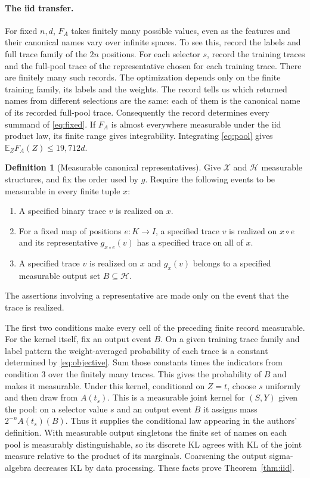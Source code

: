 \documentclass[11pt]{article}
\theoremstyle{definition}\newtheorem{definition}[theorem]{Definition}
\newcommand{\E}{\mathbb E}
\newcommand{\HH}{\mathcal H}
\newcommand{\XX}{\mathcal X}
\begin{document}
\paragraph{The iid transfer.}
For fixed $n,d$, $F_A$ takes finitely many possible values, even as the
features and their canonical names vary over infinite spaces. To see this,
record the labels and full trace family of the $2n$ positions. For each
selector $s$, record the training traces and the full-pool trace of the
representative chosen for each training trace. There are finitely many
such records. The optimization depends only on the finite training family,
its labels and the weights. The record tells us which returned names from
different selections are the same: each of them is the canonical name of
its recorded full-pool trace. Consequently the record determines every
summand of \eqref{eq:fixed}.
If $F_A$ is almost everywhere measurable under the iid product law, its
finite range gives integrability. Integrating \eqref{eq:pool} gives
$\E_Z F_A(Z)\le19{,}712d$.

\begin{definition}[Measurable canonical representatives]\label{def:selection}
Give $\XX$ and $\HH$ measurable structures, and fix the order used by $g$.
Require the following events to be measurable in every finite tuple $x$:
\begin{enumerate}
\item A specified binary trace $v$ is realized on $x$.
\item For a fixed map of positions $e:K\to I$, a specified trace $v$
is realized on $x\circ e$ and its representative $g_{x\circ e}(v)$ has
a specified trace on all of $x$.
\item A specified trace $v$ is realized on $x$ and $g_x(v)$ belongs to a
specified measurable output set $B\subseteq\HH$.
\end{enumerate}
The assertions involving a representative are made only on the event
that the trace is realized.
\end{definition}

The first two conditions make every cell of the preceding finite record
measurable. For the kernel itself, fix an output event $B$. On a given
training trace family and label pattern the weight-averaged probability of
each trace is a constant determined by \eqref{eq:objective}. Sum those
constants times the indicators from condition 3 over the finitely many
traces. This gives the probability of $B$ and makes it measurable.
Under this kernel, conditional on $Z=t$, choose $s$ uniformly and then
draw from $A(t_s)$. This is a measurable joint kernel for $(S,Y)$ given
the pool: on a selector value $s$ and an output event $B$ it assigns
mass $2^{-n} A(t_s)(B)$. Thus it supplies the conditional law appearing
in the authors' definition. With measurable output singletons the finite
set of names on each pool is
measurably distinguishable, so its discrete KL agrees with KL of the joint
measure relative to the product of its marginals. Coarsening the output
sigma-algebra decreases KL by data processing. These facts prove
Theorem~\ref{thm:iid}.
\end{document}
